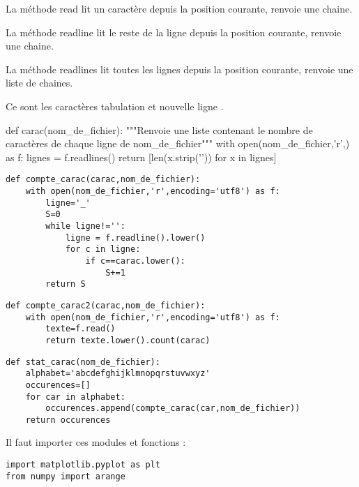 \question{} 

La méthode read lit un caractère depuis la position courante, renvoie une chaine.

La méthode readline lit le reste de la ligne depuis la position courante, renvoie une chaine.

La méthode readlines lit toutes les lignes depuis la position courante, renvoie une liste de chaines.

\question{} 


Ce sont les caractères \og tabulation\fg{} et \og nouvelle ligne\fg{} .


\question{}

\begin{pyverbatim}
def carac(nom_de_fichier):
    """Renvoie une liste contenant le nombre de caractères 
       de chaque ligne de nom_de_fichier"""
    with open(nom_de_fichier,'r',) as f:
        lignes = f.readlines()
    return [len(x.strip('\n')) for x in lignes]
\end{pyverbatim}

\question{}
\begin{lstlisting}
def compte_carac(carac,nom_de_fichier):
    with open(nom_de_fichier,'r',encoding='utf8') as f:
        ligne='_'
        S=0
        while ligne!='':
            ligne = f.readline().lower()
            for c in ligne:
                if c==carac.lower():
                    S+=1
        return S
\end{lstlisting}

\begin{lstlisting}
def compte_carac2(carac,nom_de_fichier):
    with open(nom_de_fichier,'r',encoding='utf8') as f:
        texte=f.read()
        return texte.lower().count(carac)
\end{lstlisting}


\question{}

\begin{lstlisting}
def stat_carac(nom_de_fichier):
    alphabet='abcdefghijklmnopqrstuvwxyz'
    occurences=[]
    for car in alphabet:
        occurences.append(compte_carac(car,nom_de_fichier))
    return occurences
\end{lstlisting}


\question{}

Il faut importer ces modules et fonctions : 
\begin{lstlisting}
import matplotlib.pyplot as plt
from numpy import arange
\end{lstlisting}

